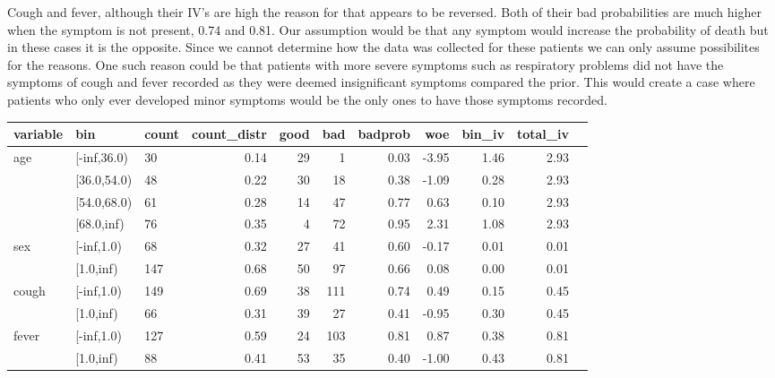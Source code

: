 Cough and fever, although their IV's are high the reason for that appears to be reversed. Both of their bad probabilities are much higher when the symptom is not present, 0.74 and 0.81. Our assumption would be that any symptom would increase the probability of death but in these cases it is the opposite. Since we cannot determine how the data was collected for these patients we can only assume possibilites for the reasons. One such reason could be that patients with more severe symptoms such as respiratory problems did not have the symptoms of cough and fever recorded as they were deemed insignificant symptoms compared the prior. This would create a case where patients who only ever developed minor symptoms would be the only ones to have those symptoms recorded. \\

\begin{table}[H]
	\centering
	\begin{tabular}{lllrrrrrrrr}
		\toprule
		variable & bin &  count &  count\_distr &  good &  bad &   badprob &       woe &    bin\_iv &  total\_iv \\
		\midrule
		         age &  [-inf,36.0) &     30 &         0.14 &    29 &    1 &     0.03 & -3.95 &    1.46 &      2.93 \\
		      &  [36.0,54.0) &     48 &         0.22 &    30 &   18 &     0.38 & -1.09 &    0.28 &      2.93 \\
		      &  [54.0,68.0) &     61 &         0.28 &    14 &   47 &     0.77 &  0.63 &    0.10 &      2.93 \\
		      &   [68.0,inf) &     76 &         0.35 &     4 &   72 &     0.95 &  2.31 &    1.08 &      2.93 \\
		\midrule
		 sex &  [-inf,1.0) &     68 &         0.32 &    27 &   41 &     0.60 & -0.17 &    0.01 &      0.01 \\
    		  &   [1.0,inf) &    147 &         0.68 &    50 &   97 &     0.66 &  0.08 &    0.00 &      0.01 \\
		\midrule
		  cough &  [-inf,1.0) &    149 &         0.69 &    38 &  111 &     0.74 &  0.49 &    0.15 &      0.45 \\
  		  &   [1.0,inf) &     66 &         0.31 &    39 &   27 &     0.41 & -0.95 &    0.30 &      0.45 \\
		\midrule
		  fever &  [-inf,1.0) &    127 &         0.59 &    24 &  103 &     0.81 &  0.87 &    0.38 &      0.81 \\
  		  &   [1.0,inf) &     88 &         0.41 &    53 &   35 &     0.40 & -1.00 &    0.43 &      0.81 \\

\end{tabular}
\end{table}
